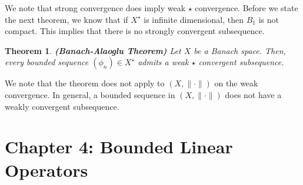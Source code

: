 \documentclass[12pt]{article}
\newtheorem{theorem}{Theorem}
\newcommand{\lp}{\left(}
\newcommand{\rp}{\right)}
\newcommand{\Xs}{X^{\star}}
\newcommand{\ns}{(X, \| \cdot \|)}
\begin{document}
 We note that strong convergence does imply weak $\star$ convergence. Before we state the next theorem, we know that if $\Xs$ is infinite dimensional, then $B_1$ is not compact. This implies that there is no strongly convergent subsequence. 
 \begin{theorem} \textbf{(Banach-Alaoglu Theorem)}
 Let $X$ be a Banach space. Then, every bounded sequence $\lp \phi_n\rp \in \Xs$ admits a weak $\star$ convergent subsequence.
 \end{theorem}
 \vspace{-25pt}
 We note that the theorem does not apply to $\ns$ on the weak convergence. In general, a bounded sequence in $\ns$ does not have a weakly convergent subsequence. 
 \section*{Chapter 4: Bounded Linear Operators}
 \setcounter{theorem}{0}
 \setcounter{proposition}{0}
  \setcounter{definition}{0}
 \setcounter{corollary}{0}
 \setcounter{cons}{0}
 \setcounter{equation}{0}
\end{document}
